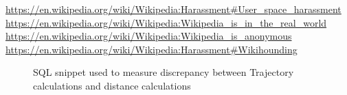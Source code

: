 \url{https://en.wikipedia.org/wiki/Wikipedia:Harassment#User_space_harassment}
\url{https://en.wikipedia.org/wiki/Wikipedia:Wikipedia_is_in_the_real_world}
\url{https://en.wikipedia.org/wiki/Wikipedia:Wikipedia_is_anonymous}
\url{https://en.wikipedia.org/wiki/Wikipedia:Harassment#Wikihounding}

\begin{figure}
  \begin{subfigure}[b!]{0.45\linewidth}
    
  \end{subfigure}
  \begin{subfigure}[b!]{0.45\linewidth}
    
  \end{subfigure}
  \caption{SQL snippet used to measure discrepancy between Trajectory
    calculations and distance calculations}
\end{figure}
